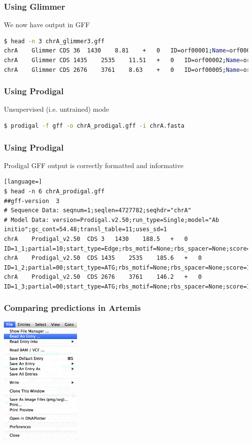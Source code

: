 \documentclass[table]{beamer}
\begin{document}
\begin{frame}[fragile]
\frametitle{Using Glimmer}
We now have output in GFF
\begin{lstlisting}[language=bash]
$ head -n 3 chrA_glimmer3.gff 
chrA	Glimmer	CDS	36	1430	8.81	+	0	ID=orf00001;Name=orf00001
chrA	Glimmer	CDS	1435	2535	11.51	+	0	ID=orf00002;Name=orf00002
chrA	Glimmer	CDS	2676	3761	8.63	+	0	ID=orf00005;Name=orf00005
\end{lstlisting}
\end{frame}

\begin{frame}[fragile]
\frametitle{Using Prodigal}
Unsupervised (i.e. untrained) mode
\begin{lstlisting}[language=bash]
$ prodigal -f gff -o chrA_prodigal.gff -i chrA.fasta
\end{lstlisting}
\end{frame}

\begin{frame}[fragile]
\frametitle{Using Prodigal}
Prodigal GFF output is correctly formatted and informative
\begin{lstlisting}[language=]
$ head -n 6 chrA_prodigal.gff 
##gff-version  3
# Sequence Data: seqnum=1;seqlen=4727782;seqhdr="chrA"
# Model Data: version=Prodigal.v2.50;run_type=Single;model="Ab initio";gc_cont=54.48;transl_table=11;uses_sd=1
chrA	Prodigal_v2.50	CDS	3	1430	188.5	+	0	ID=1_1;partial=10;start_type=Edge;rbs_motif=None;rbs_spacer=None;score=188.54;cscore=185.37;sscore=3.18;rscore=0.00;uscore=3.18;tscore=0.00
chrA	Prodigal_v2.50	CDS	1435	2535	185.6	+	0	ID=1_2;partial=00;start_type=ATG;rbs_motif=None;rbs_spacer=None;score=185.61;cscore=184.24;sscore=1.36;rscore=-7.73;uscore=3.48;tscore=4.37
chrA	Prodigal_v2.50	CDS	2676	3761	146.2	+	0	ID=1_3;partial=00;start_type=ATG;rbs_motif=None;rbs_spacer=None;score=146.19;cscore=149.82;sscore=-3.63;rscore=-7.73;uscore=-0.28;tscore=4.37
\end{lstlisting}
\end{frame}

    \begin{frame}
     \frametitle{Comparing predictions in Artemis}
      \begin{center}
        \includegraphics[width=0.3\textwidth]{images/artemis_cdspred0}     
      \end{center}
    \end{frame}
\end{document}
